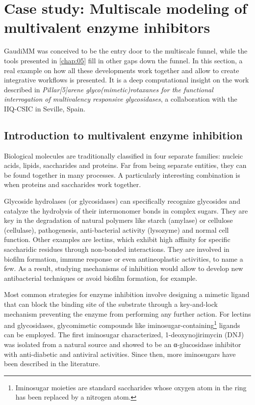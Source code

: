 
\section[Multiscale modeling of multivalent enzyme inhibitors]{Case study: Multiscale modeling of \\multivalent enzyme inhibitors}
\label{section:rotaxane}
GaudiMM was conceived to be the entry door to the multiscale funnel, while the tools presented in \autoref{chap:05} fill in other gaps down the funnel. In this section, a real example on how all these developments work together and allow to create integrative workflows is presented. It is a deep computational insight on the work described in \textit{Pillar[5]arene glyco(mimetic)rotaxanes for the functional interrogation of multivalency responsive glycosidases},\cite{rotaxane} a collaboration with the IIQ-CSIC in Seville, Spain.

\subsection{Introduction to multivalent enzyme inhibition}
Biological molecules are traditionally classified in four separate families: nucleic acids, lipids, saccharides and proteins. Far from being separate entities, they can be found together in many processes. A particularly interesting combination is when proteins and saccharides work together.

Glycoside hydrolases (or glycosidases) can specifically recognize glycosides and catalyze the hydrolysis of their intermonomer bonds in complex sugars.  They are key in the degradation of natural polymers like starch (amylase) or cellulose (cellulase), pathogenesis, anti-bacterial activity (lysozyme) and normal cell function. Other examples are lectins, which exhibit high affinity for specific saccharidic residues through non-bonded interactions. They are involved in biofilm formation,\cite{tielker2005pseudomonas} immune response\cite{turner1996mannose} or even antineoplastic activities,\cite{adwan2014} to name a few. As a result, studying mechanisms of inhibition would allow to develop new antibacterial techniques or avoid biofilm formation, for example.

Most common strategies for enzyme inhibition involve designing a mimetic ligand that can block the binding site of the substrate through a key-and-lock mechanism preventing the enzyme from performing any further action. For lectins and glycosidases, glycomimetic compounds like iminosugar-containing\footnote{Iminosugar moieties are standard saccharides whose oxygen atom in the ring has been replaced by a nitrogen atom.} ligands can be employed.  The first iminosugar characterized, 1-deoxynojirimycin (DNJ) was isolated from a natural source and showed to be an α-glucosidase inhibitor with anti-diabetic and antiviral activities. Since then, more iminosugars have been described in the literature.

